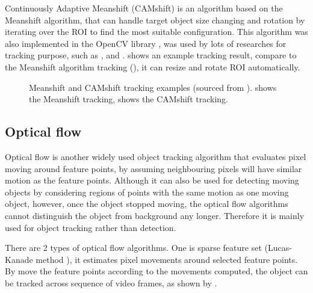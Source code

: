 
Continuously Adaptive Meanshift (CAMshift) \cite{bradski1998computer} is an algorithm based on the Meanshift algorithm, that can handle target object size changing and rotation by iterating over the ROI to find the most suitable configuration. This algorithm was also implemented in the OpenCV library \cite{opencv:camshift}, was used by lots of researches for tracking purpose, such as \cite{chu2007object}, \cite{xu2012moving} and \cite{nouar2006improved}.  shows an example tracking result, compare to the Meanshift algorithm tracking (), it can resize and rotate ROI automatically.

\begin{figure}[H]
  \centering
  \caption{Meanshift and CAMshift tracking examples (sourced from \cite{opencv:camshift}).  shows the Meanshift tracking,  shows the CAMshift tracking.}
  \label{bg:ms}
\end{figure}


\subsection {Optical flow}


Optical flow is another widely used object tracking algorithm that evaluates pixel moving around feature points, by assuming neighbouring pixels will have similar motion as the feature points. Although it can also be used for detecting moving objects by considering regions of points with the same motion as one moving object, however, once the object stopped moving, the optical flow algorithms cannot distinguish the object from background any longer. Therefore it is mainly used for object tracking rather than detection.

There are 2 types of optical flow algorithms. One is sparse feature set (Lucas-Kanade method \cite{bouguet2001pyramidal}), it estimates pixel movements around selected feature points. By move the feature points according to the movements computed, the object can be tracked across sequence of video frames, as shown by .

